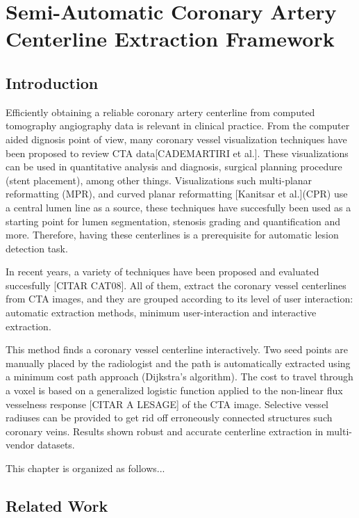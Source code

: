 \chapter{Semi-Automatic Coronary Artery Centerline Extraction Framework}
%

\section{Introduction}
%

Efficiently obtaining a reliable coronary artery centerline from computed tomography angiography data is relevant in clinical practice. From the computer aided dignosis point of view, many coronary vessel visualization techniques have been proposed to review CTA data[CADEMARTIRI et al.].  These visualizations can be used in quantitative analysis and diagnosis, surgical planning procedure (stent placement), among other things. Visualizations such multi-planar reformatting (MPR), and curved planar reformatting [Kanitsar et al.](CPR) use a central lumen line as a source, these techniques have succesfully been used as a starting point for lumen segmentation, stenosis grading and quantification and more. Therefore, having these centerlines is a prerequisite for automatic lesion detection task.

In recent years, a variety of techniques have been proposed and evaluated succesfully [CITAR CAT08]. All of them, extract the coronary vessel centerlines from CTA images, and they are grouped according to its level of user interaction: automatic extraction methods, minimum user-interaction and interactive extraction.

This method finds a coronary vessel centerline interactively. Two seed points are manually placed by the radiologist and the path is automatically extracted using a minimum cost path approach (Dijkstra’s algorithm). The cost to travel through a voxel is based on a generalized logistic function applied to the non-linear flux vesselness response [CITAR A LESAGE] of the CTA image. Selective vessel radiuses can be provided to get rid off erroneously connected structures such coronary veins. Results shown robust and accurate centerline extraction in multi-vendor datasets.

This chapter is organized as follows... 


\section{Related Work}

